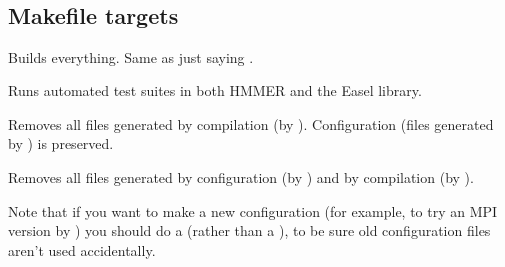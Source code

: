 \\
\\
\\
\\


\subsection{Makefile targets}

\begin{sreitems}{}
\item[\emprog{all}]
  Builds everything. Same as just saying .

\item[\emprog{check}]
  Runs automated test suites in both HMMER and the Easel library.

\item[\emprog{clean}]
  Removes all files generated by compilation (by
  ). Configuration (files generated by
  ) is preserved.

\item[\emprog{distclean}]
Removes all files generated by configuration (by )
and by compilation (by ). 

Note that if you want to make a new configuration (for example, to try
an MPI version by ) you should
do a  (rather than a ), to be
sure old configuration files aren't used accidentally.
\end{sreitems}




